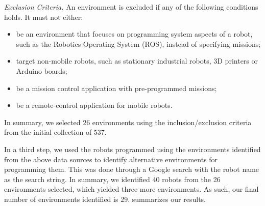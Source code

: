 \noindent
 \emph{Exclusion Criteria.} 
 An environment is excluded if any of the following conditions holds. It must not either:
\begin{itemize}
\item be an environment that focuses on programming system aspects of a robot, such as the Robotics Operating System (ROS), instead of specifying missions;
\item target non-mobile robots, such as stationary industrial robots, 3D printers or Arduino boards; 
\item be a mission control application with pre-programmed missions;
\item be a remote-control application for mobile robots.
\end{itemize}

In summary, we selected 26 environments using the inclusion/exclusion criteria from the initial collection of 537.

 In a third step, we used the robots programmed using the environments identified from the above data sources to identify alternative environments for programming them. This was done through a Google search with the robot name as the search string.
In summary, we identified 40 robots from the 26 environments selected, which yielded three more environments. As such, our final number of environments identified is 29.  summarizes our results.



